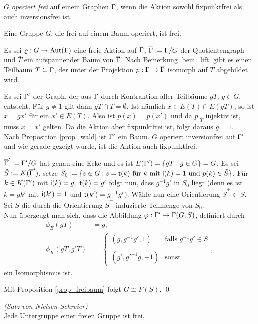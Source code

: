 \documentclass[a4paper, 12pt, twoside]{article}
\begin{document}
\DEF $G$ \emph{operiert frei}
auf einem Graphen $\Gamma$, wenn die Aktion sowohl
fixpunktfrei als auch inversionsfrei ist.

\SATZ\label{satz_frei} Eine Gruppe $G$, die frei auf einem Baum
operiert, ist frei.

\bew Es sei $\varrho:G\rightarrow\mathrm{Aut}(\Gamma)$ eine freie Aktion auf $\Gamma$,
$\overline{\Gamma}:=\Gamma/G$ der Quotientengraph und $\bar{T}$ ein aufspannender
Baum von $\overline{\Gamma}$. Nach Bemerkung \ref{bem_lift} gibt es einen
Teilbaum $T\subseteq \Gamma$, der unter der Projektion
$p:\Gamma\rightarrow\overline{\Gamma}$ isomorph auf $\bar{T}$ abgebildet wird.

Es sei $\Gamma'$ der Graph, der aus $\Gamma$ durch Kontraktion aller
Teilbäume $gT$, $g\in G$, entsteht.
Für $g\neq 1$ gilt dann $gT\cap T=\emptyset$.
Ist nämlich $x\in E(T)\cap E(gT)$, so ist $x=gx'$ für ein
$x'\in E(T)$. Also ist $p(x)=p(x')$ und da $p|_T$ injektiv ist,
muss $x=x'$ gelten. Da die Aktion aber fixpunktfrei ist, folgt
daraus $g=1$.\\
Nach Proposition \ref{prop_wald} ist $\Gamma'$ ein Baum. $G$ operiert
inversionfrei auf $\Gamma'$ und wie gerade gezeigt wurde, ist
die Aktion auch fixpunktfrei.

$\overline{\Gamma}':=\Gamma'/G$ hat genau eine Ecke und es ist
$E(\Gamma')=\{gT:g \in G\}=G$.
Es sei $\tilde{S}:= K(\overline{\Gamma}')$, setze
$S_0:=\{s\in G: s=\mathsf{t}(k)\text{ für $k$ mit $\mathsf{i}(k)=1$ und 
$p(k)\in\tilde{S}$}\}$.
Für $k\in K(\Gamma')$ mit $\mathsf{i}(k)=g$, $\mathsf{t}(k)=g'$ folgt nun,
dass $g^{-1}g'$ in $S_0$ liegt (denn es ist $k=gk'$ mit
$\mathsf{i}(k')=1$ und $\mathsf{t}(k')=g^{-1}g'$).
Wähle nun eine Orientierung $\tilde{S}^+\subset\tilde{S}$. Sei $S$
die durch die Orientierung $\tilde{S}^+$ induzierte Teilmenge von $S_0$.\\
Nun überzeugt man sich, dass die Abbildung
$\varphi:\Gamma'\rightarrow\Gamma(G,S)$, definiert durch
\begin{align*}
\phi_E(gT) &= g,\\
\phi_K(gT,g'T) &=
\left\{
\begin{matrix}
(g,g^{-1}g',1) & \text{falls } g^{-1}g'\in S \\
\\
(g',g'^{-1}g,-1) & \text{sonst}
\end{matrix}\right.,
\end{align*}
ein Isomorphismus ist.

Mit Proposition \ref{prop_freibaum} folgt $G\cong F(S)$.
\qed

\FOLG\emph{(Satz von Nielsen-Schreier)}\\
Jede Untergruppe einer freien Gruppe ist frei.
\end{document}
